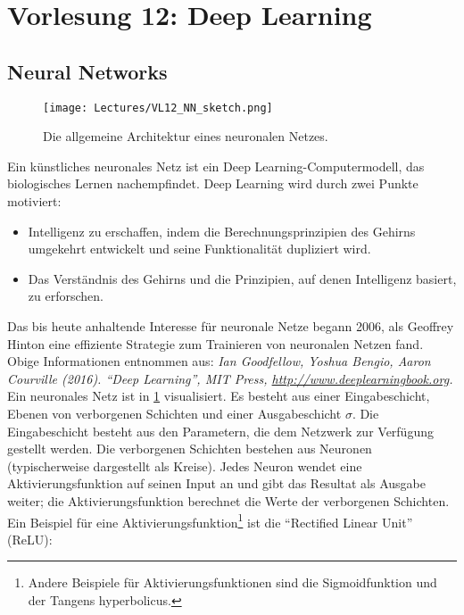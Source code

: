 \section{Vorlesung 12: Deep Learning}
\label{sec:vl12}

\subsection{Neural Networks}
\label{subsec:vl12}

\begin{figure}[th]
\centering
\texttt{[image: Lectures/VL12\_NN\_sketch.png]}
\caption{Die allgemeine Architektur eines neuronalen Netzes.}
\label{fig:vl12fig1}
\end{figure}

Ein k\"unstliches neuronales Netz ist ein Deep Learning-Computermodell, das biologisches Lernen nachempfindet. %
Deep Learning wird durch zwei Punkte motiviert:

\begin{itemize}
    \setlength\itemsep{0em}
        \item Intelligenz zu erschaffen, indem die Berechnungsprinzipien des Gehirns umgekehrt entwickelt und seine Funktionalität dupliziert wird.
        \item Das Verst\"andnis des Gehirns und die Prinzipien, auf denen Intelligenz basiert, zu erforschen.
\end{itemize}

 Das bis heute anhaltende Interesse f\"ur neuronale Netze begann 2006, als Geoffrey Hinton eine effiziente Strategie zum Trainieren von neuronalen Netzen fand.\\
 Obige Informationen entnommen aus: \textit{Ian Goodfellow, Yoshua Bengio, Aaron Courville (2016). ``Deep Learning'', MIT Press, \url{http://www.deeplearningbook.org}.}\\[0.3cm]
 Ein neuronales Netz ist in \cref{fig:vl12fig1} visualisiert. Es besteht aus einer Eingabeschicht, Ebenen von verborgenen Schichten und einer Ausgabeschicht $\sigma$. Die Eingabeschicht besteht aus den Parametern, die dem Netzwerk zur Verfügung gestellt werden. Die verborgenen Schichten bestehen aus Neuronen (typischerweise dargestellt als Kreise). Jedes Neuron wendet eine Aktivierungsfunktion auf seinen Input an und gibt das Resultat als Ausgabe weiter; die Aktivierungsfunktion berechnet die Werte der verborgenen Schichten. Ein Beispiel f\"ur eine Aktivierungsfunktion\footnote{Andere Beispiele f\"ur Aktivierungsfunktionen sind die Sigmoidfunktion und der Tangens hyperbolicus.} ist die ``Rectified Linear Unit'' (ReLU):
 
